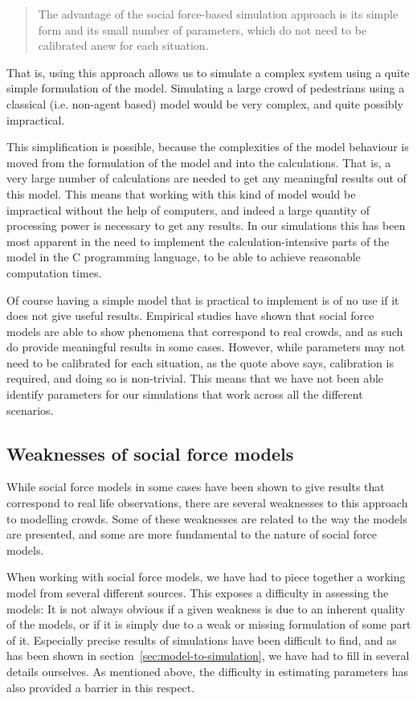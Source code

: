 \begin{quote}
    The advantage of the social force-based simulation approach is its simple 
    form and its small number of parameters, which do not need to be 
    calibrated anew for each situation.
\end{quote}

That is, using this approach allows us to simulate a complex system using a 
quite simple formulation of the model. Simulating a large crowd of pedestrians 
using a classical (i.e. non-agent based) model would be very complex, and 
quite possibly impractical.

This simplification is possible, because the complexities of the model 
behaviour is moved from the formulation of the model and into the 
calculations. That is, a very large number of calculations are needed to get 
any meaningful results out of this model. This means that working with this 
kind of model would be impractical without the help of computers, and indeed a 
large quantity of processing power is necessary to get any results. In our 
simulations this has been most apparent in the need to implement the 
calculation-intensive parts of the model in the C programming language, to be 
able to achieve reasonable computation times.

Of course having a simple model that is practical to implement is of no use if 
it does not give useful results. Empirical studies have shown that social 
force models are able to show phenomena that correspond to real crowds, and as 
such do provide meaningful results in some cases. However, while parameters 
may not need to be calibrated for each situation, as the quote above says, 
calibration is required, and doing so is non-trivial. This means that we have 
not been able identify parameters for our simulations that work across all the 
different scenarios.

\subsection{Weaknesses of social force models}
While social force models in some cases have been shown to give results that 
correspond to real life observations, there are several weaknesses to this 
approach to modelling crowds. Some of these weaknesses are related to the way 
the models are presented, and some are more fundamental to the nature of 
social force models.

When working with social force models, we have had to piece together a working 
model from several different sources. This exposes a difficulty in assessing 
the models: It is not always obvious if a given weakness is due to an inherent 
quality of the models, or if it is simply due to a weak or missing formulation 
of some part of it. Especially precise results of simulations have been 
difficult to find, and as has been shown in 
section~\ref{sec:model-to-simulation}, we have had to fill in several details 
ourselves. As mentioned above, the difficulty in estimating parameters has 
also provided a barrier in this respect.

